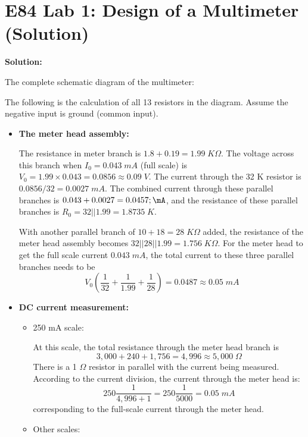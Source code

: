 \usepackage{html}
\textwidth 6.0in
\topmargin -0.5in
\oddsidemargin -0in
\evensidemargin -0.5in


\section*{E84 Lab 1: Design of a Multimeter (Solution)}

{\bf Solution:}

The complete schematic diagram of the multimeter:

    
The following is the calculation of all 13 resistors in the diagram.
Assume the negative input is ground (common input).

\begin{itemize}
\item {\bf The meter head assembly:}

  The resistance in meter branch is $1.8+0.19=1.99\; K\Omega$. The voltage across 
  this branch when $I_0=0.043\; mA$ (full scale) is $V_0=1.99\times 0.043=0.0856
  \approx 0.09\;V$. The current through the 32 K resistor is $0.0856/32=0.0027\;mA$.
  The combined current through these parallel branches is $0.043+0.0027=0.0457;\mA$, 
  and the resistance of these parallel branches is $R_0=32||1.99=1.8735\;K$. 

  With another parallel branch of $10+18=28\;K\Omega$ added, the resistance
  of the meter head assembly becomes $32||28||1.99=1.756\;K\Omega$. For the meter
  head to get the full scale current $0.043\;mA$, the total current to these three
  parallel branches needs to be
  \[ V_0(\frac{1}{32}+\frac{1}{1.99}+\frac{1}{28})=0.0487 \approx 0.05\;mA \]

\item {\bf DC current measurement:}
  \begin{itemize}
  \item 250 mA scale:
      
    At this scale, the total resistance through the meter head branch is
    \[ 3,000+240+1,756=4,996\approx 5,000\;\Omega \]
    There is a 1 $\Omega$ resistor in parallel with the current being measured.
    According to the current division, the current through the meter head is:
    \[ 250 \frac{1}{4,996+1}=250 \frac{1}{5000}=0.05\;mA \]
    corresponding to the full-scale current through the meter head.
      
  \item Other scales:


\end{itemize}
\end{itemize}

